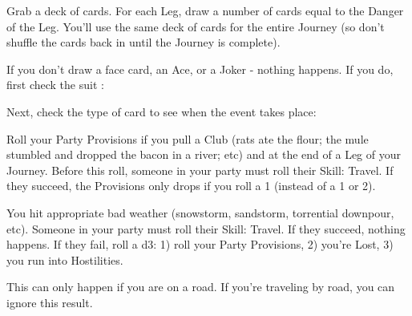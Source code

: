 {\begin{multicols}{2}
Grab a deck of cards.  For each Leg, draw a number of cards equal to the Danger of the Leg.  You'll use the same deck of cards for the entire Journey (so don't shuffle the cards back in until the Journey is complete).

If you don't draw a face card, an Ace, or a Joker - nothing happens.  If you do, first check the suit :


  Next, check the type of card to see when the event takes place:




  Roll your Party Provisions if you pull a Club (rats ate the flour; the mule stumbled and dropped the bacon in a river; etc) and at the end of a Leg of your Journey.  Before this roll, someone in your party must roll their Skill: Travel.  If they succeed, the Provisions \UD only drops \DCDOWN if you roll a 1 (instead of a 1 or 2).  

  You hit appropriate bad weather (snowstorm, sandstorm, torrential downpour, etc).  Someone in your party must roll their Skill: Travel.  If they succeed, nothing happens.  If they fail, roll a d3:  1) roll your Party Provisions, 2) you're Lost, 3) you run into Hostilities.


  This can only happen if you are  on a road. If you're traveling by road, you can ignore this result.


\end{multicols}}
